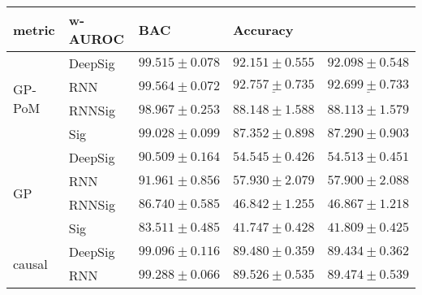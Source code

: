 \begin{tabular}{lllll}
\toprule
metric &                                        w-AUROC &                                            BAC &                                       Accuracy \\
\midrule
\multirow{4}{*}{GP-PoM}          & DeepSig &                           $ 99.515 \pm 0.078 $ &                           $ 92.151 \pm 0.555 $ &                           $ 92.098 \pm 0.548 $ \\
                                 & RNN     &                           $ 99.564 \pm 0.072 $ &            $  \underline{ 92.757 \pm 0.735 } $ &            $  \underline{ 92.699 \pm 0.733 } $ \\
                                 & RNNSig  &                           $ 98.967 \pm 0.253 $ &                           $ 88.148 \pm 1.588 $ &                           $ 88.113 \pm 1.579 $ \\
                                 & Sig     &                           $ 99.028 \pm 0.099 $ &                           $ 87.352 \pm 0.898 $ &                           $ 87.290 \pm 0.903 $ \\
\midrule
\multirow{4}{*}{GP}              & DeepSig &                           $ 90.509 \pm 0.164 $ &                           $ 54.545 \pm 0.426 $ &                           $ 54.513 \pm 0.451 $ \\
                                 & RNN     &                           $ 91.961 \pm 0.856 $ &                           $ 57.930 \pm 2.079 $ &                           $ 57.900 \pm 2.088 $ \\
                                 & RNNSig  &                           $ 86.740 \pm 0.585 $ &                           $ 46.842 \pm 1.255 $ &                           $ 46.867 \pm 1.218 $ \\
                                 & Sig     &                           $ 83.511 \pm 0.485 $ &                           $ 41.747 \pm 0.428 $ &                           $ 41.809 \pm 0.425 $ \\
\midrule
\multirow{4}{*}{causal}          & DeepSig &                           $ 99.096 \pm 0.116 $ &                           $ 89.480 \pm 0.359 $ &                           $ 89.434 \pm 0.362 $ \\
                                 & RNN     &                           $ 99.288 \pm 0.066 $ &                           $ 89.526 \pm 0.535 $ &                           $ 89.474 \pm 0.539 $ \\

\end{tabular}
